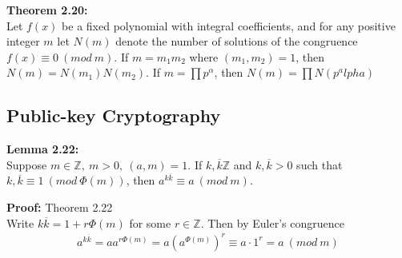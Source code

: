 \documentclass[a4paper]{article}
\begin{document}

\textbf{Theorem 2.20:}\\
Let $f(x)$ be a fixed polynomial with integral coefficients, and for any positive integer $m$ let $N(m)$ denote the number of solutions of the congruence $f(x)\equiv0\ (mod\ m)$. If $m=m_1m_2$ where $(m_1,m_2)=1$, then $N(m)=N(m_1)N(m_2)$. If $m=\prod p^\alpha$, then $N(m)=\prod N(p^alpha)$

\subsection{Public-key Cryptography}

\textbf{Lemma 2.22:}\\
Suppose $m\in\mathbb{Z},\ m>0,\ (a,m)=1$. If $k,\overline{k}\mathbb{Z}$ and $k,\overline{k}>0$ such that $k,\overline{k}\equiv1\ (mod\ \Phi(m))$, then $a^{k\overline{k}}\equiv a\ (mod\ m)$.

\textbf{Proof:} Theorem 2.22\\
Write $k\overline{k}=1+r\Phi(m)$ for some $r\in\mathbb{Z}$. Then by Euler's congruence
\begin{align*}
    a^{k\overline{k}} = aa^{r\Phi(m)} = a(a^{\Phi(m)})^r \equiv a\cdot1^r = a\ (mod\ m)
\end{align*}
\end{document}
